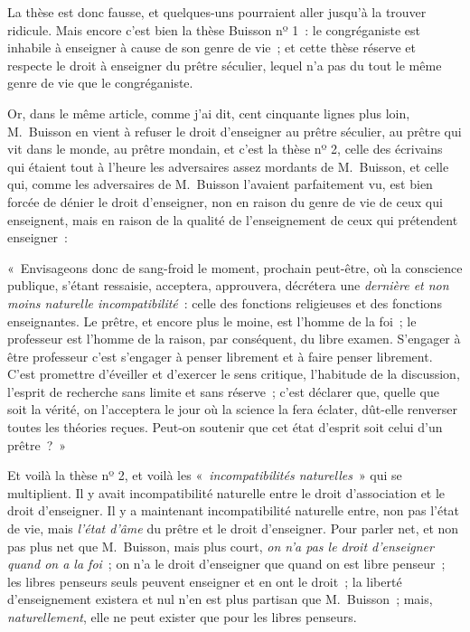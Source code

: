 \documentclass[french,twoside]{book} %
\begin{document}
La thèse est donc fausse, et quelques-uns pourraient aller jusqu’à la trouver ridicule. Mais encore c’est bien la thèse Buisson nº 1 : le congréganiste est inhabile à enseigner à cause de son genre de vie ; et cette thèse réserve et respecte le droit à enseigner du prêtre séculier, lequel n’a pas du tout le même genre de vie que le congréganiste.\par
Or, dans le même article, comme j’ai dit, cent cinquante lignes plus loin, M. Buisson en vient à refuser le droit d’enseigner au prêtre séculier, au prêtre qui vit dans le monde, au prêtre mondain, et c’est la thèse nº 2, celle des écrivains qui étaient tout à l’heure les adversaires assez mordants de M. Buisson, et celle qui, comme les adversaires de M. Buisson l’avaient parfaitement vu, est bien forcée de dénier le droit d’enseigner, non en raison du genre de vie de ceux qui enseignent, mais en raison de la qualité de l’enseignement de ceux qui prétendent enseigner :\par
« Envisageons donc de sang-froid le moment, prochain peut-être, où la conscience publique, s’étant ressaisie, acceptera, approuvera, décrétera une {\itshape dernière et non moins naturelle incompatibilité} :  celle des fonctions religieuses et des fonctions enseignantes. Le prêtre, et encore plus le moine, est l’homme de la foi ; le professeur est l’homme de la raison, par conséquent, du libre examen. S’engager à être professeur c’est s’engager à penser librement et à faire penser librement. C’est promettre d’éveiller et d’exercer le sens critique, l’habitude de la discussion, l’esprit de recherche sans limite et sans réserve ; c’est déclarer que, quelle que soit la vérité, on l’acceptera le jour où la science la fera éclater, dût-elle renverser toutes les théories reçues. Peut-on soutenir que cet état d’esprit soit celui d’un prêtre ? »\par
Et voilà la thèse nº 2, et voilà les « {\itshape incompatibilités naturelles} » qui se multiplient. Il y avait incompatibilité naturelle entre le droit d’association et le droit d’enseigner. Il y a maintenant incompatibilité naturelle entre, non pas l’état de vie, mais {\itshape l’état d’âme} du prêtre et le droit d’enseigner. Pour parler net, et non pas plus net que M. Buisson, mais plus court, {\itshape on n’a pas le droit d’enseigner quand on a la foi} ; on n’a le droit d’enseigner que quand on est libre penseur ; les libres penseurs seuls peuvent enseigner et en ont le droit ; la liberté d’enseignement existera et nul n’en est plus partisan que M. Buisson ; mais, {\itshape naturellement}, elle ne peut exister que pour les libres penseurs.\par
\end{document}
